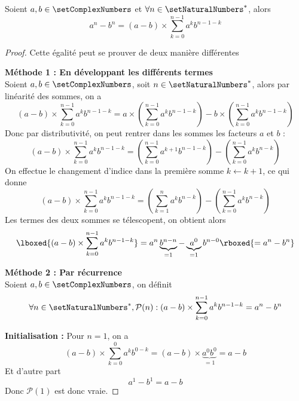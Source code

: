 \begin{lemma}
\label{somme:factorisation}
Soient $a, b \in \setComplexNumbers$ et $\forall n \in \setNaturalNumbers^*$, alors 
\[
a^n - b^n = (a-b)\times \displaystyle\sum\limits_{k=0}^{n-1} a^k b^{n - 1 - k}
\]
\end{lemma}

\begin{proof} 
Cette égalité peut se prouver de deux manière différentes

\textbf{Méthode 1 : En développant les différents termes}\\
Soient $a, b \in \setComplexNumbers$, soit $n \in \setNaturalNumbers^*$, alors par linéarité des sommes, on a 
\[
(a-b)\times \displaystyle\sum\limits_{k=0}^{n-1} a^k b^{n - 1 - k}
=a \times \left(\displaystyle\sum\limits_{k=0}^{n-1} a^{k} b^{n - 1 - k}\right) - b \times \left(\displaystyle\sum\limits_{k=0}^{n-1} a^k b^{n - 1 - k}\right)
\]
Donc par distributivité, on peut rentrer dans les sommes les facteurs $a$ et $b$ :
\[
(a-b)\times \displaystyle\sum\limits_{k=0}^{n-1} a^k b^{n - 1 - k}
=\left(\displaystyle\sum\limits_{k=0}^{n-1} a^{k+1} b^{n - 1 - k}\right) - \left(\displaystyle\sum\limits_{k=0}^{n-1} a^k b^{n - k}\right)
\]
On effectue le changement d'indice dans la première somme $k \leftarrow k+1$, ce qui donne
\[
(a-b)\times \displaystyle\sum\limits_{k=0}^{n-1} a^k b^{n - 1 - k}
=
\left(\displaystyle\sum\limits_{k=1}^{n} a^{k} b^{n - k}\right) - \left(\displaystyle\sum\limits_{k=0}^{n-1} a^k b^{n - k}\right)
\]
Les termes des deux sommes se télescopent, on obtient alors 
\[
\lboxed{(a-b)\times \displaystyle\sum\limits_{k=0}^{n-1} a^k b^{n - 1 - k}}
=
a^{n} \underbrace{b^{n - n}}_{=1} - \underbrace{a^{0}}_{=1} b^{n - 0}
\rboxed{= a^n - b^n}
\]

\textbf{Méthode 2 : Par récurrence}\\
Soient $a, b \in \setComplexNumbers$, on définit 
\[
\forall n \in \setNaturalNumbers^*,
\mathcal{P}(n) : 
(a-b)\times \displaystyle\sum\limits_{k=0}^{n-1} a^k b^{n - 1 - k}  
=  a^{n}  - b^{n}
\]

\textbf{Initialisation :} Pour $n = 1$, on a 
\[
(a-b)\times \displaystyle\sum\limits_{k=0}^{0} a^k b^{0 - k} 
=(a - b) \times  \underbrace{a^0 b^{0}}_{=1} 
= a - b
\]
Et d'autre part
\[
a^{1} - b^{1} = a - b
\]
Donc $\mathcal{P}(1)$ est donc vraie. 


\end{proof}
